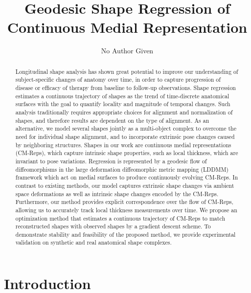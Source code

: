\documentclass{llncs}
\begin{document}
\mainmatter  %


\title{Geodesic Shape Regression of Continuous Medial Representation}
\author{No Author Given}

\maketitle

\begin{abstract}
Longitudinal shape analysis has shown great potential to improve our understanding of subject-specific changes of anatomy over time, 
in order to capture progression of disease or efficacy of therapy from baseline to follow-up observations. 
Shape regression estimates a continuous trajectory of shapes as the trend of time-discrete anatomical surfaces with the goal to quantify locality and magnitude of temporal changes. 
Such analysis traditionally requires appropriate choices for alignment and normalization of shapes, 
and therefore results are dependent on the type of alignment.
As an alternative, we model several shapes jointly as a multi-object complex to overcome the need for individual shape alignment, 
and to incorporate extrinsic pose changes caused by neighboring structures. 
Shapes in our work are continuous medial representations (CM-Reps), 
which capture intrinsic shape properties, such as local thickness, which are invariant to pose variations. 
Regression is represented by a geodesic flow of diffeomorphisms in the large deformation diffeomorphic metric mapping (LDDMM) framework which act on medial surfaces to produce continuously evolving CM-Reps. 
In contrast to existing methods, our model captures extrinsic shape changes via ambient space deformations as well as intrinsic shape changes encoded by the CM-Reps. 
Furthermore, our method provides explicit correspondence over the flow of CM-Reps, 
allowing us to accurately track local thickness measurements over time. 
We propose an optimization method that estimates a continuous trajectory of CM-Reps to match reconstructed shapes with observed shapes by a gradient descent scheme. 
To demonstrate stability and feasibility of the proposed method, we provide experimental validation on synthetic and real anatomical shape complexes.
\end{abstract}

\section{Introduction}
\end{document}

